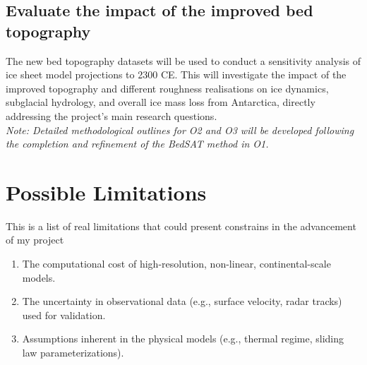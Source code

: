 \subsection{Evaluate the impact of the improved bed topography}
The new bed topography datasets will be used to conduct a sensitivity analysis of ice sheet model projections to 2300 CE. This will investigate the impact of the improved topography and different roughness realisations on ice dynamics, subglacial hydrology, and overall ice mass loss from Antarctica, directly addressing the project's main research questions.
\\
\textit{Note: Detailed methodological outlines for O2 and O3 will be developed following the completion and refinement of the BedSAT method in O1.}

\section{Possible Limitations}
This is a list of real limitations that could present constrains in the advancement of my project
\begin{enumerate}
\item The computational cost of high-resolution, non-linear, continental-scale models.
\item The uncertainty in observational data (e.g., surface velocity, radar tracks) used for validation.
\item Assumptions inherent in the physical models (e.g., thermal regime, sliding law parameterizations).
\end{enumerate} 


